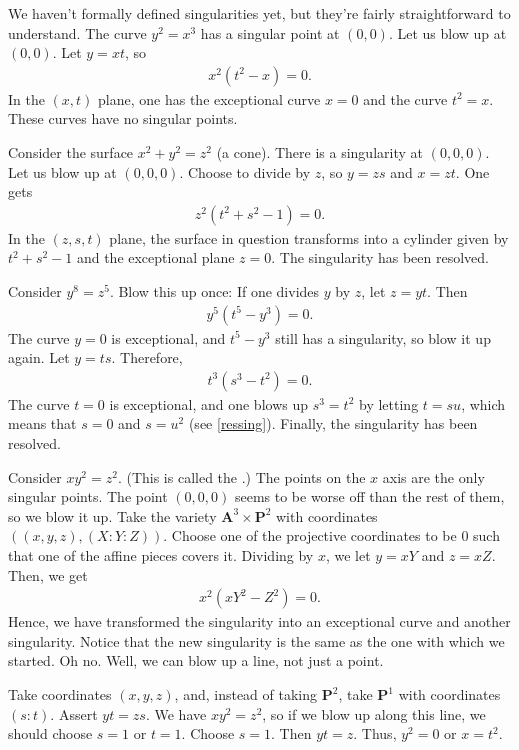 \documentclass [11 pt, oneside] {article}
\begin{document}
\begin{example}\label{ressing}
We haven't formally defined singularities yet, but they're fairly straightforward to understand. The curve $y^2=x^3$ has a singular point at $(0,0)$. Let us blow up at $(0,0)$. Let $y=xt$, so 
\begin{align*}
	x^2(t^2-x)=0.
\end{align*}
In the $(x,t)$ plane, one has the exceptional curve $x=0$ and the curve $t^2=x$. These curves have no singular points.
\end{example}

\begin{example}[ ]\label{}
Consider the surface $x^2+y^2=z^2$ (a cone). There is a singularity at $(0,0,0)$. Let us blow up at $(0,0,0)$. Choose to divide by $z$, so $y=zs$ and $x=zt$. One gets
\begin{align*}
	z^2(t^2+s^2-1)=0.
\end{align*}
In the $(z,s,t)$ plane, the surface in question transforms into a cylinder given by $t^2+s^2-1$ and the exceptional plane $z=0$. The singularity has been resolved.
\end{example}

\begin{example}[ ]\label{}
Consider $y^8=z^5$. Blow this up once: If one divides $y$ by $z$, let $z=yt$. Then
\begin{align*}
	y^5(t^5-y^3)=0.
\end{align*}
The curve $y=0$ is exceptional, and $t^5-y^3$ still has a singularity, so blow it up again. Let $y= ts$. Therefore,
\begin{align*}
	t^3(s^3-t^2)=0.
\end{align*}
The curve $t=0$ is exceptional, and one blows up $s^3=t^2 $ by letting $t=su$, which means that $s=0$ and $s=u^2$ (see \cref{ressing}). Finally, the singularity has been resolved. 
\end{example}

\begin{example}\label{ppoint}
Consider $xy^2=z^2$. (This is called the .) The points on the $x$ axis are the only singular points. The point $(0,0,0)$ seems to be worse off than the rest of them, so we blow it up. Take the variety $\mathbf{A}^3 \times \mathbf{P}^2$ with coordinates $((x,y,z),  (X:Y:Z))$. Choose one of the projective coordinates to be $0$ such that one of the affine pieces covers it. Dividing by $x$, we let $y=xY$ and $z=xZ$. Then, we get
\begin{align*}
	x^2(xY^2-Z^2)=0.
\end{align*}
Hence, we have transformed the singularity into an exceptional curve and another singularity. Notice that the new singularity is the same as the one with which we started. Oh no. Well, we can blow up a line, not just a point.

Take coordinates $(x,y,z)$, and, instead of taking $\mathbf{P}^2$, take $\mathbf{P}^1$ with coordinates $(s:t)$. Assert $yt=zs$. We have $xy^2=z^2$, so if we blow up along this line, we should choose $s=1$ or $t=1$. Choose $s=1$. Then $yt=z$. Thus, $y^2=0$ or $x=t^2$.
\end{example}
\end{document}
